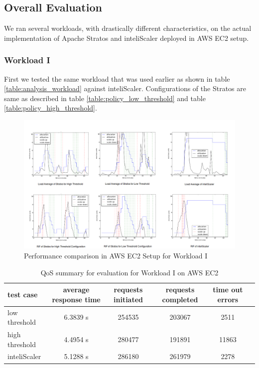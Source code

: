 \subsection{Overall Evaluation}

We ran several workloads, with drastically different characteristics, on the actual implementation of Apache Stratos and inteliScaler deployed in AWS EC2 setup.

\subsubsection{Workload I}
First we tested the same workload that was used earlier as shown in table \ref{table:analysis_workload} against inteliScaler.  Configurations of the Stratos are same as described in table \ref{table:policy_low_threshold} and table \ref{table:policy_high_threshold}.

\begin{figure}[h!]
\centering
\includegraphics[width=500px]{figures/results_workload_3_4}
\caption{Performance comparison in AWS EC2 Setup for Workload I}
\label{graph:workload_3}
\end{figure}

\begin{table}[h!]
\centering
\caption{QoS summary for evaluation for Workload I on AWS EC2}
\label{table:analysis_qos_workload_3}
\begin{tabular}{|l|c|c|c|c|c|}
\hline

test case & average  response time & requests initiated & requests completed  & time out errors \\ \hline

low threshold & 6.3839 s & 254535 & 203067 & 2511\\ \hline

high threshold & 4.4954 s & 280477 & 191891  & 11863\\ \hline

inteliScaler & 5.1288 s & 286180 & 261979  & 2278\\ \hline

\end{tabular}
\end{table}

